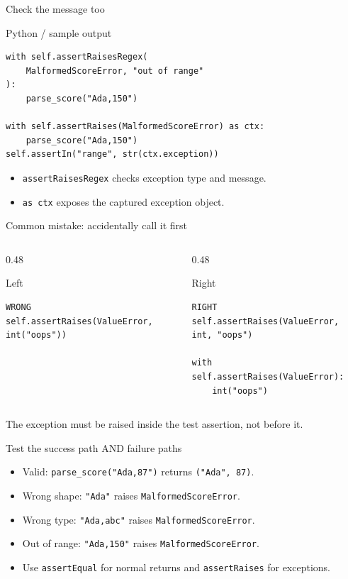 \documentclass[aspectratio=169,10pt]{beamer}
\begin{document}
\begin{frame}[fragile]{Check the message too}
\begin{block}{Python / sample output}
\begin{Verbatim}[fontsize=\footnotesize]
with self.assertRaisesRegex(
    MalformedScoreError, "out of range"
):
    parse_score("Ada,150")

with self.assertRaises(MalformedScoreError) as ctx:
    parse_score("Ada,150")
self.assertIn("range", str(ctx.exception))
\end{Verbatim}
\end{block}
\small\begin{itemize}\item \texttt{assertRaisesRegex} checks exception type and message.\item \texttt{as ctx} exposes the captured exception object.\end{itemize}
\end{frame}
\begin{frame}[fragile]{Common mistake: accidentally call it first}
\begin{columns}[T,onlytextwidth]
\begin{column}{0.48\textwidth}\begin{block}{Left}
\begin{Verbatim}[fontsize=\footnotesize]
WRONG
self.assertRaises(ValueError, int("oops"))
\end{Verbatim}
\end{block}\end{column}
\begin{column}{0.48\textwidth}\begin{block}{Right}
\begin{Verbatim}[fontsize=\footnotesize]
RIGHT
self.assertRaises(ValueError, int, "oops")

with self.assertRaises(ValueError):
    int("oops")
\end{Verbatim}
\end{block}\end{column}
\end{columns}
\vspace{0.06in}\begin{keyidea}\small The exception must be raised inside the test assertion, not before it.\end{keyidea}
\end{frame}
\begin{frame}[fragile]{Test the success path AND failure paths}
\begin{itemize}\item Valid: \texttt{parse\_score("Ada,87")} returns \texttt{("Ada", 87)}.\item Wrong shape: \texttt{"Ada"} raises \texttt{MalformedScoreError}.\item Wrong type: \texttt{"Ada,abc"} raises \texttt{MalformedScoreError}.\item Out of range: \texttt{"Ada,150"} raises \texttt{MalformedScoreError}.\item Use \texttt{assertEqual} for normal returns and \texttt{assertRaises} for exceptions.\end{itemize}
\end{frame}
\end{document}
